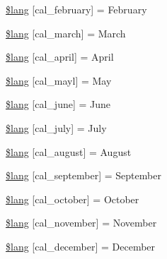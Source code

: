 \begin{DoxyCompactItemize}
\item 
\hyperlink{calendar__lang_8php_a32a50b63add7abc253c9bc36f4fa6f72}{\$lang} \mbox{[}\textquotesingle{}cal\+\_\+february\textquotesingle{}\mbox{]} = \textquotesingle{}February\textquotesingle{}
\item 
\hyperlink{calendar__lang_8php_af69ae8067fe6af9913575c2338bdcb00}{\$lang} \mbox{[}\textquotesingle{}cal\+\_\+march\textquotesingle{}\mbox{]} = \textquotesingle{}March\textquotesingle{}
\item 
\hyperlink{calendar__lang_8php_a91b47019689ab8d459212335c8bb558f}{\$lang} \mbox{[}\textquotesingle{}cal\+\_\+april\textquotesingle{}\mbox{]} = \textquotesingle{}April\textquotesingle{}
\item 
\hyperlink{calendar__lang_8php_a000c61063bbbaeda4e1e0f81717cf6f2}{\$lang} \mbox{[}\textquotesingle{}cal\+\_\+mayl\textquotesingle{}\mbox{]} = \textquotesingle{}May\textquotesingle{}
\item 
\hyperlink{calendar__lang_8php_acf04877cbc6934c38186bfaad8f7c4f0}{\$lang} \mbox{[}\textquotesingle{}cal\+\_\+june\textquotesingle{}\mbox{]} = \textquotesingle{}June\textquotesingle{}
\item 
\hyperlink{calendar__lang_8php_a067d03b1260e590cabb18e68c08f3868}{\$lang} \mbox{[}\textquotesingle{}cal\+\_\+july\textquotesingle{}\mbox{]} = \textquotesingle{}July\textquotesingle{}
\item 
\hyperlink{calendar__lang_8php_a8e8cfd4eda2dda803f5c4f6cbbf2279f}{\$lang} \mbox{[}\textquotesingle{}cal\+\_\+august\textquotesingle{}\mbox{]} = \textquotesingle{}August\textquotesingle{}
\item 
\hyperlink{calendar__lang_8php_a7223c2b685dfa0a6e9a9ebec0e9e912b}{\$lang} \mbox{[}\textquotesingle{}cal\+\_\+september\textquotesingle{}\mbox{]} = \textquotesingle{}September\textquotesingle{}
\item 
\hyperlink{calendar__lang_8php_af49c3d53649acdf354e7cf9a210f7aa0}{\$lang} \mbox{[}\textquotesingle{}cal\+\_\+october\textquotesingle{}\mbox{]} = \textquotesingle{}October\textquotesingle{}
\item 
\hyperlink{calendar__lang_8php_aa05ad18c3c08c3184efd08188bdc2c56}{\$lang} \mbox{[}\textquotesingle{}cal\+\_\+november\textquotesingle{}\mbox{]} = \textquotesingle{}November\textquotesingle{}
\item 
\hyperlink{calendar__lang_8php_ac4bbc26ddae9900021fe967b02bc7a6c}{\$lang} \mbox{[}\textquotesingle{}cal\+\_\+december\textquotesingle{}\mbox{]} = \textquotesingle{}December\textquotesingle{}
\end{DoxyCompactItemize}


